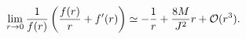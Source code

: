 \begin{equation}
\lim_{r \rightarrow 0} {1 \over f(r)} \left ( {f(r) \over r} + f'(r) \right ) \simeq
- {1 \over r} + {8M \over J^2} r + {\cal O}(r^3).
\label{coef1_r0}
\end{equation}

